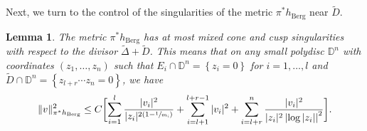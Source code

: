 \documentclass[10pt]{amsart}
\theoremstyle{plain}
\newtheorem{lemma}[theorem]{Lemma}
\theoremstyle{definition}
\numberwithin{equation}{theorem}
\newcommand{\norm}[1] { \| #1 \| }
\begin{document}
Next, we turn to the control of the singularities of the metric $\pi^\ast h_{\mathrm{Berg}}$ near $\widetilde{D}$.

\begin{lemma} The metric $\pi^\ast h_{\mathrm{Berg}}$ has at most mixed cone and cusp singularities with respect to the divisor $\widetilde{\Delta} + \widetilde{D}$. This means that on any small polydisc $\mathbb D^n$ with coordinates $(z_1, \ldots , z_n)$ such that $E_i \cap \mathbb D^n = \left\{ z_i = 0 \right\}$ for $i = 1, \ldots, l$ and $\widetilde{D} \cap \mathbb D^n = \left\{ z_{l+r} \cdots z_{n} = 0 \right\}$, we have
\begin{equation} \label{mixedconicalcusp}
\norm{v}^2_{\pi^\ast h_{\mathrm{Berg}}} \leq C \biggl[ \sum_{i = 1}^{l} \frac{|v_i|^2}{|z_i|^{2(1 - \sfrac{1}{m_i})}} + \sum_{i=l+1}^{l+r-1} |v_i|^2 + \sum_{i = l + r }^{n} \frac{|v_i|^2}{|z_i|^2 \left| \log |z_i| \right|^2} \biggr].
\end{equation}
\end{lemma}
\end{document}
